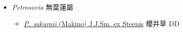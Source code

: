 
  \begin{itemize}
 \item[] \textit{Petrosavia} 無葉蓮屬
                    
  \begin{itemize}
        \item[] \href{http://www.theplantlist.org/tpl1.1/search?q=Petrosavia+sakuraii}{\textit{P. sakuraii} (Makino) J.J.Sm. ex Steenis}   櫻井草 DD
  \end{itemize}
  \end{itemize}
